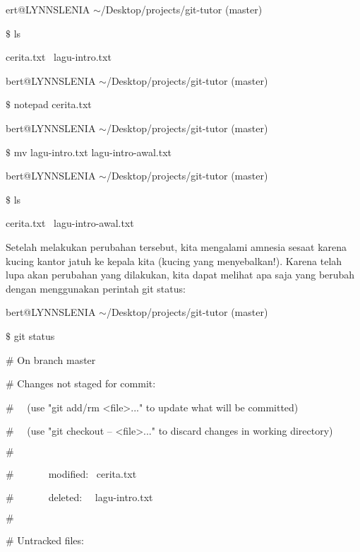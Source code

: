 ert@LYNNSLENIA  $  \sim  $/Desktop/projects/git-tutor (master) \par
 $  \$  $ ls \par
cerita.txt~ lagu-intro.txt \par
bert@LYNNSLENIA  $  \sim  $/Desktop/projects/git-tutor (master) \par
 $  \$  $ notepad cerita.txt \par
bert@LYNNSLENIA  $  \sim  $/Desktop/projects/git-tutor (master) \par
 $  \$  $ mv lagu-intro.txt lagu-intro-awal.txt \par
bert@LYNNSLENIA  $  \sim  $/Desktop/projects/git-tutor (master) \par
 $  \$  $ ls \par
cerita.txt~ lagu-intro-awal.txt \par
\vspace{12pt}
Setelah melakukan perubahan tersebut, kita mengalami amnesia sesaat karena kucing kantor jatuh ke kepala kita (kucing yang menyebalkan!). Karena telah lupa akan perubahan yang dilakukan, kita dapat melihat apa saja yang berubah dengan menggunakan perintah git status: \par
\noindent 
{\fontsize{10pt}{10pt}\selectfont bert@LYNNSLENIA  $  \sim  $/Desktop/projects/git-tutor (master)} \par
\noindent 
{\fontsize{10pt}{10pt}\selectfont  $  \$  $ git status} \par
\noindent 
{\fontsize{10pt}{10pt}\selectfont  $  \#  $ On branch master} \par
\noindent 
{\fontsize{10pt}{10pt}\selectfont  $  \#  $ Changes not staged for commit:} \par
\noindent 
{\fontsize{10pt}{10pt}\selectfont  $  \#  $~~ (use "git add/rm <file>..." to update what will be committed)} \par
\noindent 
{\fontsize{10pt}{10pt}\selectfont  $  \#  $~~ (use "git checkout -- <file>..." to discard changes in working directory)} \par
\noindent 
{\fontsize{10pt}{10pt}\selectfont  $  \#  $} \par
\noindent 
{\fontsize{10pt}{10pt}\selectfont  $  \#  $~~~~~~~modified:~  cerita.txt} \par
\noindent 
{\fontsize{10pt}{10pt}\selectfont  $  \#  $~~~~~~~deleted:~~  lagu-intro.txt} \par
\noindent 
{\fontsize{10pt}{10pt}\selectfont  $  \#  $} \par
\noindent 
{\fontsize{10pt}{10pt}\selectfont  $  \#  $ Untracked files:} \par
